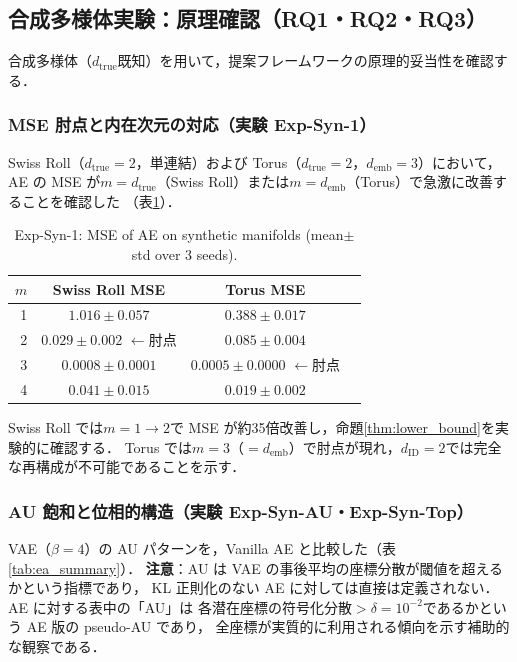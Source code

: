 \documentclass[11pt,a4paper]{jsarticle}
\newcommand{\dID}{d_{\mathrm{ID}}}
\newcommand{\dtrue}{d_{\mathrm{true}}}
\newcommand{\demb}{d_{\mathrm{emb}}}
\begin{document}
\subsection{合成多様体実験：原理確認（RQ1・RQ2・RQ3）}\label{sec:exp_synthetic}

合成多様体（$\dtrue$既知）を用いて，提案フレームワークの原理的妥当性を確認する．

\subsubsection{MSE 肘点と内在次元の対応（実験 Exp-Syn-1）}

Swiss Roll（$\dtrue = 2$，単連結）および Torus（$\dtrue = 2$，$\demb = 3$）において，
AE の MSE が$m = \dtrue$（Swiss Roll）または$m = \demb$（Torus）で急激に改善することを確認した
（表\ref{tab:e1}）．

\begin{table}[H]
\centering
\caption{Exp-Syn-1: MSE of AE on synthetic manifolds (mean$\pm$std over 3 seeds).}
\label{tab:e1}
\small
\begin{tabular}{rccc}
\toprule
$m$ & Swiss Roll MSE & Torus MSE \\
\midrule
1 & $1.016\pm0.057$ & $0.388\pm0.017$ \\
2 & $\boldsymbol{0.029\pm0.002}$ $\leftarrow$肘点 & $0.085\pm0.004$ \\
3 & $0.0008\pm0.0001$ & $\boldsymbol{0.0005\pm0.0000}$ $\leftarrow$肘点 \\
4 & $0.041\pm0.015$ & $0.019\pm0.002$ \\
\bottomrule
\end{tabular}
\end{table}

Swiss Roll では$m = 1 \to 2$で MSE が約35倍改善し，命題\ref{thm:lower_bound}を実験的に確認する．
Torus では$m = 3$（$= \demb$）で肘点が現れ，$\dID = 2$では完全な再構成が不可能であることを示す．

\subsubsection{AU 飽和と位相的構造（実験 Exp-Syn-AU・Exp-Syn-Top）}

VAE（$\beta = 4$）の AU パターンを，Vanilla AE と比較した（表\ref{tab:ea_summary}）．
\textbf{注意}：AU は VAE の事後平均の座標分散が閾値を超えるかという指標であり，
KL 正則化のない AE に対しては直接は定義されない．AE に対する表中の「AU」は
各潜在座標の符号化分散$> \delta = 10^{-2}$であるかという AE 版の pseudo-AU であり，
全座標が実質的に利用される傾向を示す補助的な観察である．
\end{document}
